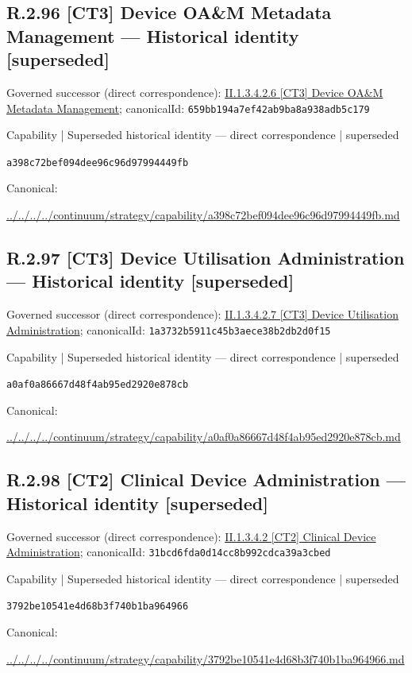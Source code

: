 \documentclass[10pt,a4paper]{article}
\begin{document}
\subsection*{R.2.96 [CT3] Device OA\&M Metadata Management — Historical identity [superseded]}
Governed successor (direct correspondence): \hyperref[element-659bb194a7ef42ab9ba8a938adb5c179]{II.1.3.4.2.6 [CT3] Device OA\&M Metadata Management}; canonicalId: \texttt{659bb194a7ef42ab9ba8a938adb5c179}\par
\label{element-a398c72bef094dee96c96d97994449fb}
{\small Capability | Superseded historical identity — direct correspondence | superseded}\par
\texttt{a398c72bef094dee96c96d97994449fb}\par
Canonical: \par
{\footnotesize\url{../../../../continuum/strategy/capability/a398c72bef094dee96c96d97994449fb.md}}\par
\subsection*{R.2.97 [CT3] Device Utilisation Administration — Historical identity [superseded]}
Governed successor (direct correspondence): \hyperref[element-1a3732b5911c45b3aece38b2db2d0f15]{II.1.3.4.2.7 [CT3] Device Utilisation Administration}; canonicalId: \texttt{1a3732b5911c45b3aece38b2db2d0f15}\par
\label{element-a0af0a86667d48f4ab95ed2920e878cb}
{\small Capability | Superseded historical identity — direct correspondence | superseded}\par
\texttt{a0af0a86667d48f4ab95ed2920e878cb}\par
Canonical: \par
{\footnotesize\url{../../../../continuum/strategy/capability/a0af0a86667d48f4ab95ed2920e878cb.md}}\par
\subsection*{R.2.98 [CT2] Clinical Device Administration — Historical identity [superseded]}
Governed successor (direct correspondence): \hyperref[element-31bcd6fda0d14cc8b992cdca39a3cbed]{II.1.3.4.2 [CT2] Clinical Device Administration}; canonicalId: \texttt{31bcd6fda0d14cc8b992cdca39a3cbed}\par
\label{element-3792be10541e4d68b3f740b1ba964966}
{\small Capability | Superseded historical identity — direct correspondence | superseded}\par
\texttt{3792be10541e4d68b3f740b1ba964966}\par
Canonical: \par
{\footnotesize\url{../../../../continuum/strategy/capability/3792be10541e4d68b3f740b1ba964966.md}}\par
\end{document}
